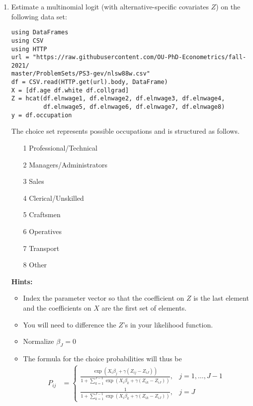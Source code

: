 \documentclass[12pt,english]{article}
\begin{document}
\begin{enumerate}
\item Estimate a multinomial logit (with alternative-specific covariates $Z$) on the following data set:

\begin{verbatim}
using DataFrames
using CSV
using HTTP
url = "https://raw.githubusercontent.com/OU-PhD-Econometrics/fall-2021/
master/ProblemSets/PS3-gev/nlsw88w.csv"
df = CSV.read(HTTP.get(url).body, DataFrame)
X = [df.age df.white df.collgrad]
Z = hcat(df.elnwage1, df.elnwage2, df.elnwage3, df.elnwage4, 
         df.elnwage5, df.elnwage6, df.elnwage7, df.elnwage8)
y = df.occupation
\end{verbatim}

The choice set represents possible occupations and is structured  as follows.

\begin{enumerate}
    \item[1] Professional/Technical 
    \item[2] Managers/Administrators
    \item[3] Sales                  
    \item[4] Clerical/Unskilled     
    \item[5] Craftsmen              
    \item[6] Operatives             
    \item[7] Transport              
    \item[8] Other                  
\end{enumerate}

\textbf{Hints:} 
\begin{itemize}
    \item Index the parameter vector so that the coefficient on $Z$ is the last element and the coefficients on $X$ are the first set of elements.
    \item You will need to difference the $Z$'s in your likelihood function. 
    \item Normalize $\beta_J = 0$
    \item The formula for the choice probabilities will thus be
    \begin{align*}
        P_{ij} &= \begin{cases} \frac{\exp\left(X_{i}\beta_j + \gamma(Z_{ij}-Z_{iJ})\right)}{1+\sum_{k=1}^{J-1}\exp\left(X_{i}\beta_k + \gamma(Z_{ik}-Z_{iJ})\right)} ,& j=1,\ldots,J-1\\
         \frac{1}{1+\sum_{k=1}^{J-1}\exp\left(X_{i}\beta_k + \gamma(Z_{ik}-Z_{iJ})\right)} ,& j=J
         \end{cases}
    \end{align*}
\end{itemize}


\end{enumerate}
\end{document}
